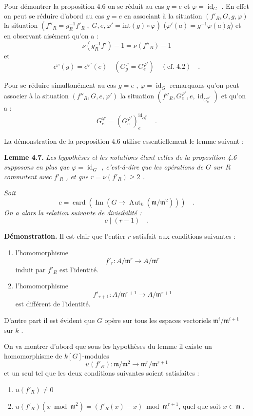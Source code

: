 \documentclass[11pt]{article}
\providecommand{\fm}{\mathfrak{m}}
\providecommand{\id}{\operatorname{id}}
\providecommand{\id}{\operatorname{id}}
\providecommand{\id}{\operatorname{id}}
\providecommand{\Aut}{\operatorname{Aut}}
\providecommand{\id}{\operatorname{id}}
\providecommand{\id}{\operatorname{id}}
\providecommand{\im}{\operatorname{Im}}
\providecommand{\fm}{\mathfrak m}
\providecommand{\card}{\operatorname{card}}
\providecommand{\im}{\operatorname{im}}
\providecommand{\Aut}{\operatorname{Aut}}
\begin{document}
\medskip

Pour démontrer la proposition 4.6 on se réduit au cas $g = e$ et $\varphi = \id_G$ . En effet on peut se réduire d'abord au cas $g = e$ en associant à la situation $(f'_R, G, g, \varphi)$ la situation $(f''_R = g_R^{-1}f'_R \; , \; G, e, \varphi' = \mathrm{int}(g) \circ \varphi)$ ($\varphi'(a) = g^{-1}\varphi(a)g$) et en observant aisément qu'on a :
\[
\nu(g_R^{-1}f') - 1 = \nu(f''_R) - 1
\]
et
\[
c^\varphi(g) = c^{\varphi'}(e) \quad (G_g^\varphi = G_e^{\varphi'}) \quad (\text{cf. 4.2}) \quad .
\]

Pour se réduire simultanément au cas $g = e$ , $\varphi = \id_G$ remarquons qu'on peut associer à la situation $(f''_R, G, e, \varphi')$ la situation $(f''_R, G_e^{\varphi'}, e, \id_{G_e^{\varphi'}})$ et qu'on a :
\[
G_e^{\varphi'} = (G_e^{\varphi'})_e^{\id_{G_e^{\varphi'}}} \quad .
\]

La démonstration de la proposition 4.6 utilise essentiellement le lemme suivant :

\medskip
\noindent
\textbf{Lemme 4.7.} \emph{Les hypothèses et les notations étant celles de la proposition 4.6 supposons en plus que $\varphi = \id_G$ , c'est-à-dire que les opérations de $G$ sur $R$ commutent avec $f'_R$ , et que $r = \nu(f'_R) \geq 2$ .}

\emph{Soit
\[
c = \card(\im(G \longrightarrow \Aut_k(\fm/\fm^2))) \quad .
\]
On a alors la relation suivante de divisibilité :
\[
c \mid (r - 1) \quad .
\]}

\medskip

\noindent
\textbf{Démonstration.} Il est clair que l'entier $r$ satisfait aux conditions suivantes :
\begin{enumerate}
\item[a)] l'homomorphisme
\[
f'_r : A/\fm^r \longrightarrow A/\fm^r
\]
induit par $f'_R$ est l'identité.
\item[b)] l'homomorphisme
\[
f'_{r+1} : A/\fm^{r+1} \longrightarrow A/\fm^{r+1}
\]
est différent de l'identité.
\end{enumerate}

D'autre part il est évident que $G$ opère sur tous les espaces vectoriels $\fm^i/\fm^{i+1}$ sur $k$ .

On va montrer d'abord que sous les hypothèses du lemme il existe un homomorphisme de $k[G]$-modules
\[
u(f'_R) : \fm/\fm^2 \longrightarrow \fm^r/\fm^{r+1}
\]
et un seul tel que les deux conditions suivantes soient satisfaites :
\begin{enumerate}
\item[1)] $u(f'_R) \neq 0$
\item[2)] $u(f'_R)(x \bmod \fm^2) = (f'_R(x) - x) \bmod \fm^{r+1}$, quel que soit $x \in \fm$ .
\end{enumerate}
\end{document}
